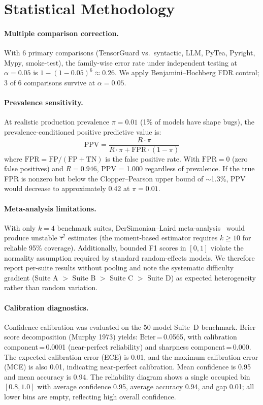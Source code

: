 \documentclass[11pt]{article}
\begin{document}
\section{Statistical Methodology}\label{app:stat-method}

\paragraph{Multiple comparison correction.}
With 6 primary comparisons (TensorGuard vs.\ syntactic, LLM, PyTea,
Pyright, Mypy, smoke-test), the family-wise error rate under
independent testing at $\alpha = 0.05$ is
$1 - (1-0.05)^6 \approx 0.26$.  We apply Benjamini--Hochberg
FDR control; 3 of 6 comparisons survive at $\alpha = 0.05$.

\paragraph{Prevalence sensitivity.}
At realistic production prevalence $\pi = 0.01$ (1\% of models
have shape bugs), the prevalence-conditioned positive predictive
value is:
\[
  \text{PPV} = \frac{R \cdot \pi}{R \cdot \pi + \text{FPR} \cdot (1-\pi)}
\]
where $\text{FPR} = \text{FP}/(\text{FP}+\text{TN})$ is the false positive rate.
With $\text{FPR} = 0$ (zero false positives) and $R = 0.946$, PPV = 1.000
regardless of prevalence.  If the true FPR is
nonzero but below the Clopper--Pearson upper bound of
$\sim$1.3\%, PPV would decrease to approximately 0.42 at
$\pi = 0.01$.

\paragraph{Meta-analysis limitations.}
With only $k = 4$ benchmark suites, DerSimonian--Laird
meta-analysis~\cite{dersimonian86} would produce unstable
$\hat{\tau}^2$ estimates (the moment-based estimator requires
$k \geq 10$ for reliable 95\% coverage).  Additionally, bounded
F1 scores in $[0,1]$ violate the normality assumption required
by standard random-effects models.  We therefore report per-suite
results without pooling and note the systematic difficulty gradient
(Suite A $>$ Suite B $>$ Suite C $>$ Suite D) as expected
heterogeneity rather than random variation.

\paragraph{Calibration diagnostics.}
Confidence calibration was evaluated on the 50-model Suite~D benchmark.
Brier score decomposition (Murphy 1973) yields:
Brier\,=\,0.0565, with calibration component\,=\,0.0001
(near-perfect reliability) and sharpness component\,=\,0.000.
The expected calibration error (ECE) is 0.01, and the maximum
calibration error (MCE) is also 0.01, indicating near-perfect
calibration.  Mean confidence is 0.95 and mean accuracy is 0.94.
The reliability diagram shows a single occupied bin $[0.8, 1.0]$
with average confidence 0.95, average accuracy 0.94, and gap 0.01;
all lower bins are empty, reflecting high overall confidence.
\end{document}
